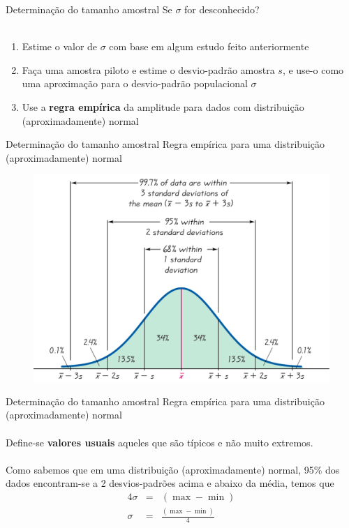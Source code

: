 \documentclass[10pt]{beamer}\usepackage[]{graphicx}\usepackage[]{color}
\theoremstyle{definition}
\begin{document}
\begin{frame}{Determinação do tamanho amostral}
  Se $\sigma$ for desconhecido?\\~\\
  \begin{enumerate}
  \item Estime o valor de $\sigma$ com base em algum estudo feito
    anteriormente
  \item Faça uma amostra piloto e estime o desvio-padrão amostra $s$, e
    use-o como uma aproximação para o desvio-padrão populacional $\sigma$
  \item Use a \textbf{regra empírica} da amplitude para dados com
    distribuição (aproximadamente) normal
  \end{enumerate}
\end{frame}

\begin{frame}{Determinação do tamanho amostral}
  Regra empírica para uma distribuição (aproximadamente) normal
  \begin{figure}[h]
    \centering
    \includegraphics[width=.8\textwidth]{empirica}
  \end{figure}
\end{frame}

\begin{frame}{Determinação do tamanho amostral}
  Regra empírica para uma distribuição (aproximadamente) normal\\~\\
  Define-se \textbf{valores usuais} aqueles que são típicos e não muito
  extremos. \\~\\
  Como sabemos que em uma distribuição (aproximadamente) normal, 95\%
  dos dados encontram-se a 2 desvios-padrões acima e abaixo da média,
  temos que
  \begin{eqnarray*}
    4\sigma &=& (\max - \min) \\
    \sigma &=& \frac{(\max - \min)}{4}
  \end{eqnarray*}
\end{frame}
\end{document}
